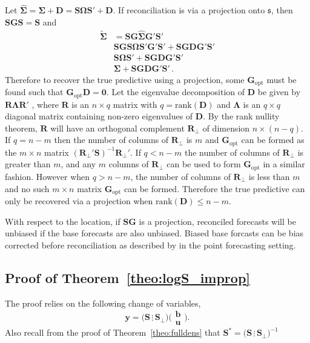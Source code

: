\documentclass[a4paper,12pt]{article}
\theoremstyle{definition}
\begin{document}
Let $\hat{\bm{\Sigma}}=\bm{\Sigma}+\bm{D}=\bm{S}\bm{\Omega}{\bm{S}}'+\bm{D}$.  If reconciliation is via a projection onto $\mathfrak{s}$, then $\bm{S}\bm{G}\bm{S}=\bm{S}$ and
\begin{align}
\tilde{\bm{\Sigma}}&=\bm{S}\bm{G}\hat{\bm{\Sigma}}\bm{G}'\bm{S}'\nonumber\\
&\bm{S}\bm{G}\bm{S}\bm{\Omega}\bm{S}'\bm{G}'{\bm{S}}'+\bm{S}\bm{G}\bm{D}\bm{G}'\bm{S}'\nonumber\\
&\bm{S}\bm{\Omega}{\bm{S}}'+\bm{S}\bm{G}\bm{D}\bm{G}'\bm{S}'\nonumber\\
&\bm{\Sigma}+\bm{S}\bm{G}\bm{D}\bm{G}'\bm{S}'\nonumber\,.
\end{align}
Therefore to recover the true predictive using a projection, some $\bm{G}_{\text{opt}}$ must be found such that $\bm{G}_{\text{opt}}\bm{D}=\bm{0}$. Let the eigenvalue decomposition of $\bm{D}$ be given by $\bm{R}\bm{\Lambda}\bm{R}'$ , where $\bm{R}$ is an $n\times q$ matrix with $q=\textrm{rank}({\bm{D}})$ and ${\bm\Lambda}$ is an $q\times q$ diagonal matrix containing non-zero eigenvalues of $\bm{D}$. By the rank nullity theorem, $\bm{R}$ will have an orthogonal complement $\bm{R}_{\perp}$ of dimension $n\times (n-q)$. If $q=n-m$ then the number of columns of $\bm{R}_{\perp}$ is $m$ and $\bm{G}_{\text{opt}}$ can be formed as the $m\times n$ matrix $(\bm{R}_{\perp}'\bm{S})^{-1}\bm{R}_{\perp}'$. If $q<n-m$ the number of columns of $\bm{R}_{\perp}$ is greater than $m$, and any $m$ columns of $\bm{R}_{\perp}$ can be used to form $\bm{G}_{\text{opt}}$ in a similar fashion. However when $q>n-m$, the number of columns of $\bm{R}_{\perp}$ is less than $m$ and no such $m\times n$ matrix $\bm{G}_{\text{opt}}$ can be formed. Therefore the true predictive can only be recovered via a projection when $\textrm{rank}(\bm{D})\leq n-m$.

With respect to the location, if $\bm{S}\bm{G}$ is a projection, reconciled forecasts will be unbiased if the base forecasts are also unbiased. Biased base forcasts can be bias corrected before reconciliation as described by \cite{PanEtAl2020_Geometry} in the point forecasting setting.

\subsection{Proof of Theorem~\ref{theo:logS_improp}}\label{app:logS_improp}

The proof relies on the following change of variables,
\[
\bm{y}=\big(\bm{S}\,\vdots\,\bm{S}_\perp\big)\bigg(\begin{matrix}\bm{b}\\\bm{u}\end{matrix}\bigg).
\]
Also recall from the proof of Theorem~\ref{theo:fulldens} that $\bm{S}^*=\big(\bm{S}\,\vdots\,\bm{S}_\perp\big)^{-1}$
\end{document}
